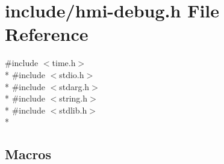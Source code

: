 \hypertarget{include_2hmi-debug_8h}{}\section{include/hmi-\/debug.h File Reference}
\label{include_2hmi-debug_8h}
{\ttfamily \#include $<$time.\+h$>$}\\*
{\ttfamily \#include $<$stdio.\+h$>$}\\*
{\ttfamily \#include $<$stdarg.\+h$>$}\\*
{\ttfamily \#include $<$string.\+h$>$}\\*
{\ttfamily \#include $<$stdlib.\+h$>$}\\*
\subsection*{Macros}
